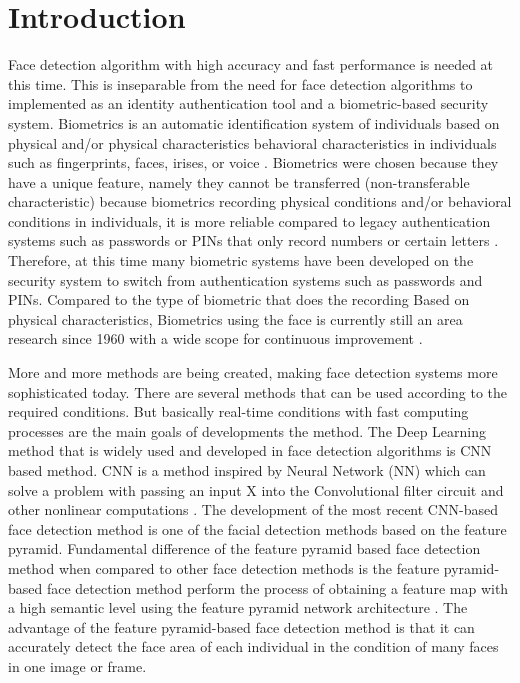 \section{Introduction}
\label{sec:pendahuluan}


Face detection algorithm with high accuracy and fast performance is needed
at this time. This is inseparable from the need for face detection algorithms to
implemented as an identity authentication tool and a biometric-based security system.
Biometrics is an automatic identification system of individuals based on physical and/or physical characteristics
behavioral characteristics in individuals such as fingerprints, faces, irises, or voice \citep{doi:10.1080/09505431.2018.1519534}.
Biometrics were chosen because they have a unique feature, namely they cannot be transferred (non-transferable characteristic) because biometrics
recording physical conditions and/or behavioral conditions in individuals, it is more
reliable compared to legacy authentication systems such as passwords or PINs that only record numbers
or certain letters \citep{1597098}. Therefore, at this time many biometric systems have been developed
on the security system to switch from authentication systems such as passwords and PINs. Compared to the type of biometric that does the recording
Based on physical characteristics, Biometrics using the face is currently still an area
research since 1960 with a wide scope for continuous improvement \citep{zufar}.

More and more methods are being created, making face detection systems more sophisticated today.
There are several methods that can be used according to the required conditions. But basically
real-time conditions with fast computing processes are the main goals of developments
the method. The Deep Learning method that is widely used and developed in face detection algorithms is
CNN based method. CNN is a method inspired by Neural Network (NN) which can solve
a problem with passing an input X into the Convolutional filter circuit and other nonlinear computations \citep{lecun1989handwritten}.
The development of the most recent CNN-based face detection method is one of the facial detection methods based on the feature pyramid. Fundamental difference
of the feature pyramid based face detection method when compared to other face detection methods is the feature pyramid-based face detection method
perform the process of obtaining a feature map with a high semantic level using the feature pyramid network architecture \citep{lin2017feature}. 
The advantage of the feature pyramid-based face detection method is that it can accurately detect the face area of each individual 
in the condition of many faces in one image or frame.

